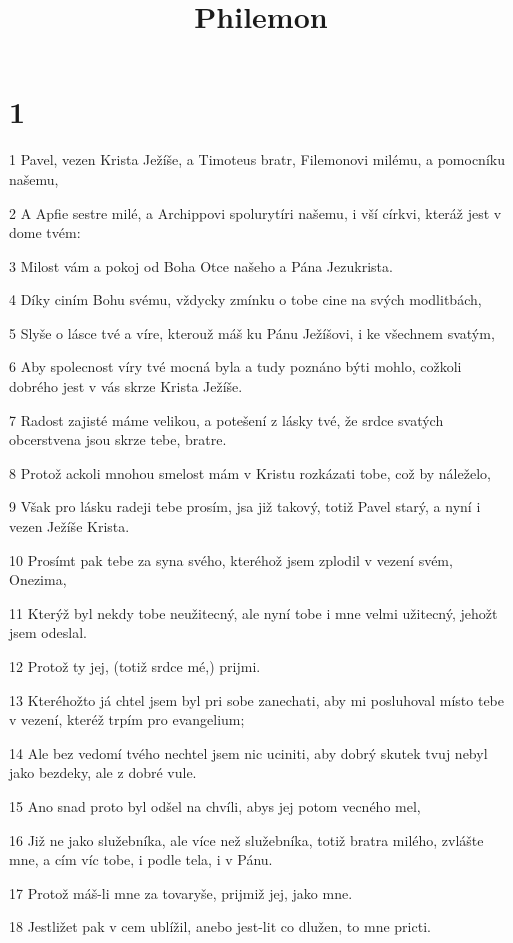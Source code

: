 

\title{Philemon}

\chapter{1}

\par 1 Pavel, vezen Krista Ježíše, a Timoteus bratr, Filemonovi milému, a pomocníku našemu,
\par 2 A Apfie sestre milé, a Archippovi spolurytíri našemu, i vší církvi, kteráž jest v dome tvém:
\par 3 Milost vám a pokoj od Boha Otce našeho a Pána Jezukrista.
\par 4 Díky ciním Bohu svému, vždycky zmínku o tobe cine na svých modlitbách,
\par 5 Slyše o lásce tvé a víre, kterouž máš ku Pánu Ježíšovi, i ke všechnem svatým,
\par 6 Aby spolecnost víry tvé mocná byla a tudy poznáno býti mohlo, cožkoli dobrého jest v vás skrze Krista Ježíše.
\par 7 Radost zajisté máme velikou, a potešení z lásky tvé, že srdce svatých obcerstvena jsou skrze tebe, bratre.
\par 8 Protož ackoli mnohou smelost mám v Kristu rozkázati tobe, což by náleželo,
\par 9 Však pro lásku radeji tebe prosím, jsa již takový, totiž Pavel starý, a nyní i vezen Ježíše Krista.
\par 10 Prosímt pak tebe za syna svého, kteréhož jsem zplodil v vezení svém, Onezima,
\par 11 Kterýž byl nekdy tobe neužitecný, ale nyní tobe i mne velmi užitecný, jehožt jsem odeslal.
\par 12 Protož ty jej, (totiž srdce mé,) prijmi.
\par 13 Kteréhožto já chtel jsem byl pri sobe zanechati, aby mi posluhoval místo tebe v vezení, kteréž trpím pro evangelium;
\par 14 Ale bez vedomí tvého nechtel jsem nic uciniti, aby dobrý skutek tvuj nebyl jako bezdeky, ale z dobré vule.
\par 15 Ano snad proto byl odšel na chvíli, abys jej potom vecného mel,
\par 16 Již ne jako služebníka, ale více než služebníka, totiž bratra milého, zvlášte mne, a cím víc tobe, i podle tela, i v Pánu.
\par 17 Protož máš-li mne za tovaryše, prijmiž jej, jako mne.
\par 18 Jestližet pak v cem ublížil, anebo jest-lit co dlužen, to mne pricti.
